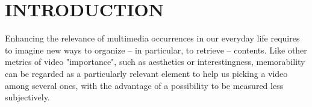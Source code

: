 \documentclass[sigconf]{acmart}
\begin{document}


\maketitle


\section{INTRODUCTION}%

Enhancing the relevance of multimedia occurrences in our everyday life requires to imagine new ways to organize -- in particular, to retrieve -- contents.
Like other metrics of video "importance", such as aesthetics or interestingness, memorability can be regarded as a particularly relevant element to help us picking a video among several ones, with the advantage of a possibility to be measured less subjectively.
\end{document}
